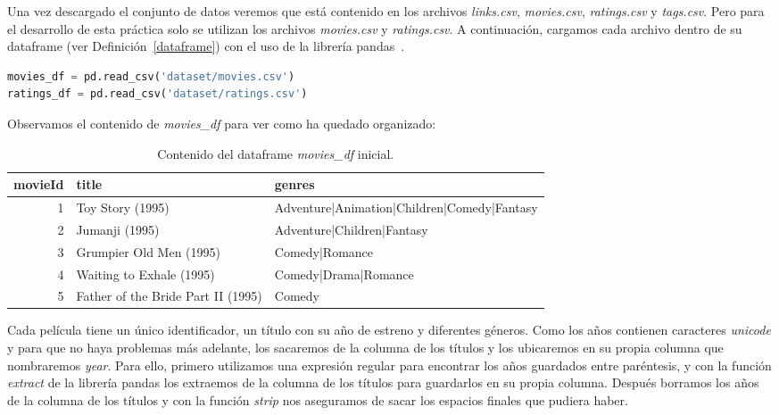 \documentclass{uimppracticas}
\begin{document}
Una vez descargado el conjunto de datos veremos que está contenido en los archivos \textit{links.csv}, \textit{movies.csv}, \textit{ratings.csv} y \textit{tags.csv}. Pero para el desarrollo de esta práctica solo se utilizan los archivos \textit{movies.csv} y \textit{ratings.csv}. A continuación, cargamos cada archivo dentro de su dataframe (ver Definición~\ref{dataframe}) con el uso de la librería pandas~\cite{pandas}.

\begin{lstlisting}[language=python]
movies_df = pd.read_csv('dataset/movies.csv')
ratings_df = pd.read_csv('dataset/ratings.csv')
\end{lstlisting}

Observamos el contenido de \textit{movies\_df} para ver como ha quedado organizado:

\begin{table}[h]
	\centering
	\begin{tabular}{rll}
		\toprule
		movieId &                               title &                                       genres \\
		\midrule
		1 &                    Toy Story (1995) &  Adventure|Animation|Children|Comedy|Fantasy \\
		2 &                      Jumanji (1995) &                   Adventure|Children|Fantasy \\
		3 &             Grumpier Old Men (1995) &                               Comedy|Romance \\
		4 &            Waiting to Exhale (1995) &                         Comedy|Drama|Romance \\
		5 &  Father of the Bride Part II (1995) &                                       Comedy \\
		\bottomrule
	\end{tabular}
	\caption{Contenido del dataframe \textit{movies\_df} inicial.}
	\label{movies_df}
\end{table}

Cada película tiene un único identificador, un título con su año de estreno y diferentes géneros. Como los años contienen caracteres \textit{unicode} y para que no haya problemas más adelante, los sacaremos de la columna de los títulos y los ubicaremos en su propia columna que nombraremos \textit{year}. Para ello, primero utilizamos una expresión regular para encontrar los años guardados entre paréntesis, y con la función \textit{extract} de la librería pandas los extraemos de la columna de los títulos para guardarlos en su propia columna. Después borramos los años de la columna de los títulos y con la función \textit{strip} nos aseguramos de sacar los espacios finales que pudiera haber.
\end{document}
